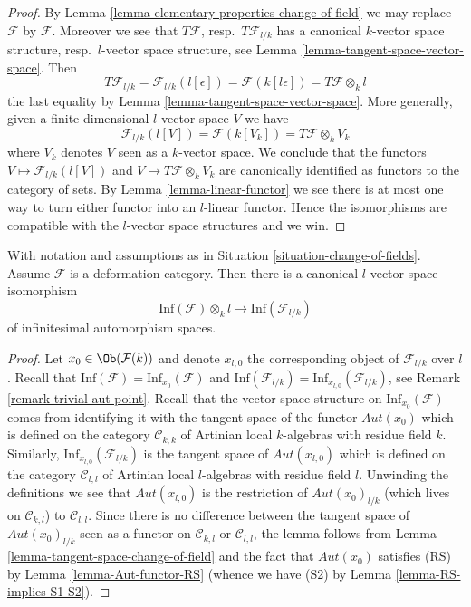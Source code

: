 \begin{proof}
By Lemma \ref{lemma-elementary-properties-change-of-field} we may replace
$\mathcal{F}$ by $\overline{\mathcal{F}}$. Moreover we see that
$T\mathcal{F}$, resp.\ $T\mathcal{F}_{l/k}$ has a canonical
$k$-vector space structure, resp.\ $l$-vector space structure, see
Lemma \ref{lemma-tangent-space-vector-space}. Then
$$
T\mathcal{F}_{l/k} = \mathcal{F}_{l/k}(l[\epsilon])
= \mathcal{F}(k[l\epsilon]) = T\mathcal{F} \otimes_k l
$$
the last equality by Lemma \ref{lemma-tangent-space-vector-space}.
More generally, given a finite dimensional $l$-vector space $V$ we have
$$
\mathcal{F}_{l/k}(l[V]) = \mathcal{F}(k[V_k]) = T\mathcal{F} \otimes_k V_k
$$
where $V_k$ denotes $V$ seen as a $k$-vector space. We conclude that
the functors $V \mapsto \mathcal{F}_{l/k}(l[V])$ and
$V \mapsto T\mathcal{F} \otimes_k V_k$ are canonically identified
as functors to the category of sets. By Lemma \ref{lemma-linear-functor}
we see there is at most one way to turn either functor into an $l$-linear
functor. Hence the isomorphisms are compatible with the $l$-vector space
structures and we win.
\end{proof}

\begin{lemma}
\label{lemma-inf-aut-change-of-field}
With notation and assumptions as in Situation \ref{situation-change-of-fields}.
Assume $\mathcal{F}$ is a deformation category.
Then there is a
canonical $l$-vector space isomorphism
$$
\text{Inf}(\mathcal{F}) \otimes_k l
\longrightarrow
\text{Inf}(\mathcal{F}_{l/k})
$$
of infinitesimal automorphism spaces.
\end{lemma}

\begin{proof}
Let $x_0 \in \Ob(\mathcal{F}(k))$ and denote $x_{l, 0}$ the corresponding
object of $\mathcal{F}_{l/k}$ over $l$. Recall that
$\text{Inf}(\mathcal{F}) = \text{Inf}_{x_0}(\mathcal{F})$ and
$\text{Inf}(\mathcal{F}_{l/k}) = \text{Inf}_{x_{l, 0}}(\mathcal{F}_{l/k})$,
see Remark \ref{remark-trivial-aut-point}.
Recall that the vector space structure on
$\text{Inf}_{x_0}(\mathcal{F})$ comes from identifying it with the tangent
space of the functor $\mathit{Aut}(x_0)$ which is defined on
the category $\mathcal{C}_{k, k}$ of Artinian local $k$-algebras with
residue field $k$. Similarly, $\text{Inf}_{x_{l, 0}}(\mathcal{F}_{l/k})$
is the tangent space of $\mathit{Aut}(x_{l, 0})$ which is defined on the
category $\mathcal{C}_{l, l}$ of Artinian local $l$-algebras with residue
field $l$. Unwinding the definitions we see that
$\mathit{Aut}(x_{l, 0})$ is the restriction of $\mathit{Aut}(x_0)_{l/k}$
(which lives on $\mathcal{C}_{k, l}$) to $\mathcal{C}_{l, l}$. Since
there is no difference between the tangent space of
$\mathit{Aut}(x_0)_{l/k}$ seen as a functor on $\mathcal{C}_{k, l}$ or
$\mathcal{C}_{l, l}$, the lemma follows from 
Lemma \ref{lemma-tangent-space-change-of-field}
and the fact that $\mathit{Aut}(x_0)$ satisfies (RS) by
Lemma \ref{lemma-Aut-functor-RS} (whence we have (S2) by
Lemma \ref{lemma-RS-implies-S1-S2}).
\end{proof}


